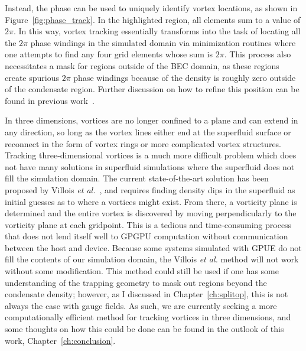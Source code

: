 Instead, the phase can be used to uniquely identify vortex locations, as shown in Figure~\ref{fig:phase_track}.
In the highlighted region, all elements sum to a value of $2\pi$.
In this way, vortex tracking essentially transforms into the task of locating all the $2\pi$ phase windings in the simulated domain via minimization routines where one attempts to find any four grid elements whose sum is $2\pi$.
This process also necessitates a mask for regions outside of the BEC domain, as these regions create spurious $2\pi$ phase windings because of the density is roughly zero outside of the condensate region. 
Further discussion on how to refine this position can be found in previous work~\cite{o2017, docs}.

In three dimensions, vortices are no longer confined to a plane and can extend in any direction, so long as the vortex lines either end at the superfluid surface or reconnect in the form of vortex rings or more complicated vortex structures.
Tracking three-dimensional vortices is a much more difficult problem which does not have many solutions in superfluid simulations where the superfluid does not fill the simulation domain.
The current state-of-the-art solution has been proposed by Villois \textit{et al.}~\cite{villois2016}, and requires finding density dips in the superfluid as initial guesses as to where a vortices might exist.
From there, a vorticity plane is determined and the entire vortex is discovered by moving perpendicularly to the vorticity plane at each gridpoint.
This is a tedious and time-consuming process that does not lend itself well to GPGPU computation without communication between the host and device.
Because some systems simulated with GPUE do not fill the contents of our simulation domain, the Villois \textit{et al.} method will not work without some modification.
This method could still be used if one has some understanding of the trapping geometry to mask out regions beyond the condensate density; however, as I discussed in Chapter~\ref{ch:splitop}, this is not always the case with gauge fields.
As such, we are currently seeking a more computationally efficient method for tracking vortices in three dimensions, and some thoughts on how this could be done can be found in the outlook of this work, Chapter~\ref{ch:conclusion}.

